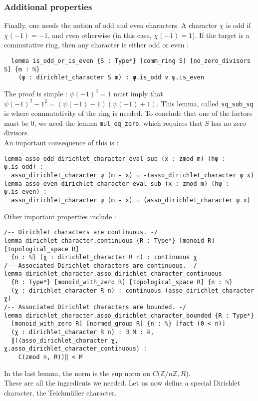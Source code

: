 \documentclass[11pt]{article}
\newcommand{\lean}[1]{\texttt{#1}\xspace} %
\begin{document}
\subsubsection{Additional properties}
Finally, one needs the notion of odd and even characters. A character $\chi$ is odd if $\chi (-1) = -1$, and 
even otherwise (in this case, $\chi (-1) = 1$). If the target is a commutative ring, then any character is 
either odd or even : 
\begin{lstlisting}
  lemma is_odd_or_is_even {S : Type*} [comm_ring S] [no_zero_divisors S] {m : ℕ} 
    (ψ : dirichlet_character S m) : ψ.is_odd ∨ ψ.is_even
\end{lstlisting}
The proof is simple : $\psi (-1)^2 = 1$ must imply that $\psi(-1)^2 - 1^2 = (\psi(-1) - 1)(\psi(-1) + 1)$. 
This lemma, called \lean{sq\_sub\_sq} is where commutativity of the ring is needed. To conclude that one 
of the factors must be 0, we need the lemma \lean{mul\_eq\_zero}, which requires that $S$ has no zero divisors. \\
An important consequence of this is : 
\begin{lstlisting}
lemma asso_odd_dirichlet_character_eval_sub (x : zmod m) (hψ : ψ.is_odd) :
  asso_dirichlet_character ψ (m - x) = -(asso_dirichlet_character ψ x)
lemma asso_even_dirichlet_character_eval_sub (x : zmod m) (hψ : ψ.is_even) :
  asso_dirichlet_character ψ (m - x) = (asso_dirichlet_character ψ x)
\end{lstlisting}

Other important properties include : 
\begin{lstlisting}
/-- Dirichlet characters are continuous. -/
lemma dirichlet_character.continuous {R : Type*} [monoid R] [topological_space R]
  {n : ℕ} (χ : dirichlet_character R n) : continuous χ
/-- Associated Dirichlet characters are continuous. -/
lemma dirichlet_character.asso_dirichlet_character_continuous
  {R : Type*} [monoid_with_zero R] [topological_space R] {n : ℕ} 
  (χ : dirichlet_character R n) : continuous (asso_dirichlet_character χ) 
/-- Associated Dirichlet characters are bounded. -/
lemma dirichlet_character.asso_dirichlet_character_bounded {R : Type*} 
  [monoid_with_zero R] [normed_group R] {n : ℕ} [fact (0 < n)] 
  (χ : dirichlet_character R n) : ∃ M : ℝ,
  ‖(⟨asso_dirichlet_character χ, χ.asso_dirichlet_character_continuous⟩ : 
    C(zmod n, R))‖ < M 
\end{lstlisting}

In the last lemma, the norm is the sup norm on $C(\mathbb{Z}/n \mathbb{Z}, R$). \\
These are all the ingredients we needed. Let us now define a special Dirichlet character, the Teichmüller character.
\end{document}
